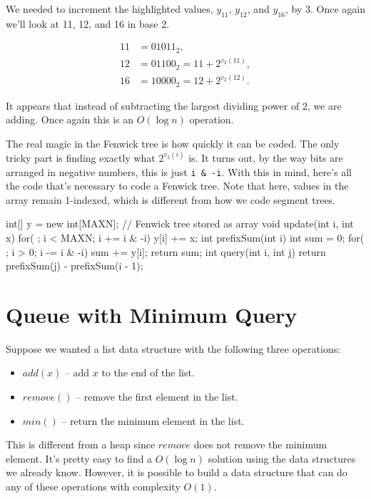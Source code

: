 We needed to increment the highlighted values, $y_{11}$, $y_{12}$, and $y_{16}$, by 3. Once again we'll look at 11, 12, and 16 in base 2.

\begin{align*}
11 &= 01011_2, \\
12 &= 01100_2 = 11 + 2^{v_2(11)}, \\
16 &= 10000_2 = 12 + 2^{v_2(12)}.
\end{align*}

It appears that instead of subtracting the largest dividing power of 2, we are adding. Once again this is an $O(\log{n})$ operation.

The real magic in the Fenwick tree is how quickly it can be coded. The only tricky part is finding exactly what $2^{v_2(i)}$ is. It turns out, by the way bits are arranged in negative numbers, this is just \texttt{i \& -i}. With this in mind, here's all the code that's necessary to code a Fenwick tree. Note that here, values in the array remain 1-indexed, which is different from how we code segment trees.

\begin{mylstlisting}
int[] y = new int[MAXN]; // Fenwick tree stored as array
void update(int i, int x) {
	for( ; i < MAXN; i += i & -i)
		y[i] += x;
}
int prefixSum(int i) {
	int sum = 0;
	for( ; i > 0; i -= i & -i)
		sum += y[i];
	return sum;
}
int query(int i, int j) {
	return prefixSum(j) - prefixSum(i - 1);
}
\end{mylstlisting}

\section{Queue with Minimum Query}

Suppose we wanted a list data structure with the following three operations:

\begin{itemize}

\item
$add(x)$ -- add $x$ to the end of the list.

\item
$remove()$ -- remove the first element in the list.

\item
$min()$ -- return the minimum element in the list.

\end{itemize}

This is different from a heap since $remove$ does not remove the minimum element. It's pretty easy to find a $O(\log{n})$ solution using the data structures we already know. However, it is possible to build a data structure that can do any of these operations with complexity $O(1)$.

